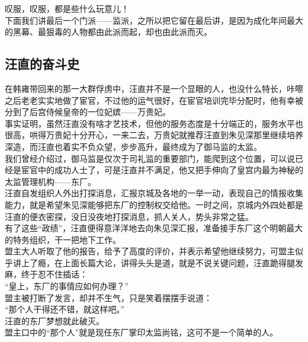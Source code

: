 \begin{multicols}{\theparacolNo}
叹服，叹服，都是些什么玩意儿！\\

下面我们讲最后一个门派——监派，之所以把它留在最后讲，是因为成化年间最大的黑幕、最狠毒的人物都由此派而起，却也由此派而灭。\\

\subsection{汪直的奋斗史}
在韩雍带回来的那一大群俘虏中，汪直并不是一个显眼的人，也没什么特长，咔嚓之后老老实实地做了宦官，不过他的运气很好，在宦官培训完毕分配时，他有幸被分到了后宫侍候皇帝的一位妃嫔——万贵妃。\\

事实证明，虽然汪直没有啥才艺技术，但他的服务态度是十分端正的，服务水平也很高，哄得万贵妃十分开心，一来二去，万贵妃就推荐汪直到朱见深那里继续培养深造，而汪直也着实不负众望，步步高升，最终成为了御马监的太监。\\

我们曾经介绍过，御马监是仅次于司礼监的重要部门，能爬到这个位置，可以说已经是宦官中的成功人士了，可是汪直并不满足，他又把手伸向了皇宫内最为神秘的太监管理机构——东厂。\\

汪直自发组织人外出打探消息，汇报京城及各地的一举一动，表现自己的情报收集能力，就是希望朱见深能够把东厂的控制权交给他。一时之间，京城内外四处都是汪直的便衣密探，没日没夜地打探消息，抓人关人，势头非常之猛。\\

有了这些“政绩”，汪直便得意洋洋地去向朱见深汇报，准备接手东厂这个明朝最大的特务组织，干一把地下工作。\\

盟主大人听取了他的报告，给予了高度的评价，并表示希望他继续努力，可盟主似乎讲上了瘾，在上面长篇大论，讲得头头是道，就是不说关键问题，汪直跪得腿发麻，终于忍不住插话：\\

“皇上，东厂的事情应如何办理？”\\

盟主被打断了发言，却并不生气，只是笑着摆摆手说道：\\

“那个人干得还不错，就这样吧。”\\

汪直的东厂梦想就此破灭。\\

盟主口中的“那个人”就是现任东厂掌印太监尚铭，这可不是一个简单的人。\\


\end{multicols}
